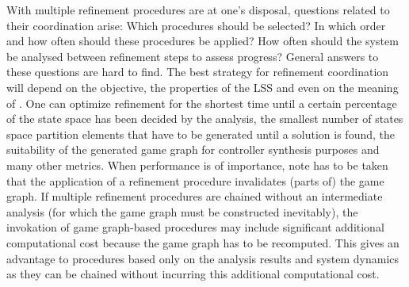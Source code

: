 With multiple refinement procedures are at one's disposal, questions related to their coordination arise:
Which procedures should be selected?
In which order and how often should these procedures be applied?
How often should the system be analysed between refinement steps to assess progress?
General answers to these questions are hard to find.
The best strategy for refinement coordination will depend on the objective, the properties of the LSS and even on the meaning of .
One can optimize refinement for the shortest time until a certain percentage of the state space has been decided by the analysis, the smallest number of states space partition elements that have to be generated until a solution is found, the suitability of the generated game graph for controller synthesis purposes and many other metrics.
When performance is of importance, note has to be taken that the application of a refinement procedure invalidates (parts of) the game graph.
If multiple refinement procedures are chained without an intermediate analysis (for which the game graph must be constructed inevitably), the invokation of game graph-based procedures may include significant additional computational cost because the game graph has to be recomputed.
This gives an advantage to procedures based only on the analysis results and system dynamics as they can be chained without incurring this additional computational cost.

